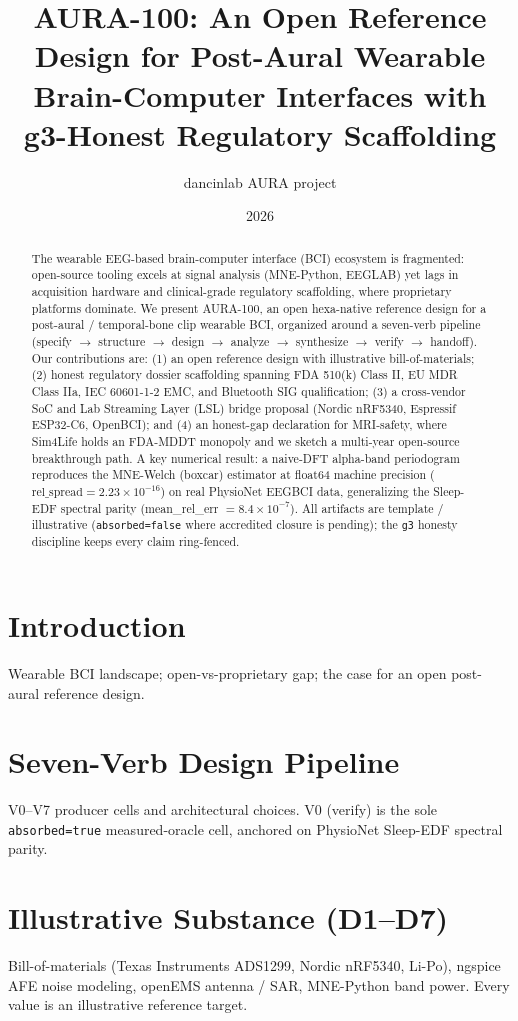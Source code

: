 \documentclass[11pt]{article}
\title{AURA-100: An Open Reference Design for Post-Aural Wearable\\
Brain-Computer Interfaces with g3-Honest Regulatory Scaffolding}
\author{dancinlab AURA project}
\date{2026}
\begin{document}
\maketitle

\begin{abstract}
The wearable EEG-based brain-computer interface (BCI) ecosystem is
fragmented: open-source tooling excels at signal analysis (MNE-Python,
EEGLAB) yet lags in acquisition hardware and clinical-grade regulatory
scaffolding, where proprietary platforms dominate. We present AURA-100,
an open hexa-native reference design for a post-aural / temporal-bone
clip wearable BCI, organized around a seven-verb pipeline
(specify $\to$ structure $\to$ design $\to$ analyze $\to$ synthesize
$\to$ verify $\to$ handoff). Our contributions are: (1) an open
reference design with illustrative bill-of-materials; (2) honest
regulatory dossier scaffolding spanning FDA 510(k) Class II, EU MDR
Class IIa, IEC 60601-1-2 EMC, and Bluetooth SIG qualification; (3) a
cross-vendor SoC and Lab Streaming Layer (LSL) bridge proposal
(Nordic nRF5340, Espressif ESP32-C6, OpenBCI); and (4) an honest-gap
declaration for MRI-safety, where Sim4Life holds an FDA-MDDT monopoly
and we sketch a multi-year open-source breakthrough path. A key
numerical result: a naive-DFT alpha-band periodogram reproduces the
MNE-Welch (boxcar) estimator at float64 machine precision
($\text{rel\_spread} = 2.23 \times 10^{-16}$) on real PhysioNet
EEGBCI data, generalizing the Sleep-EDF spectral parity
(mean\_rel\_err $= 8.4 \times 10^{-7}$). All artifacts are
template / illustrative (\texttt{absorbed=false} where accredited
closure is pending); the \texttt{g3} honesty discipline keeps every
claim ring-fenced.
\end{abstract}

\section{Introduction}
Wearable BCI landscape; open-vs-proprietary gap; the case for an open
post-aural reference design.

\section{Seven-Verb Design Pipeline}
V0--V7 producer cells and architectural choices. V0 (verify) is the
sole \texttt{absorbed=true} measured-oracle cell, anchored on
PhysioNet Sleep-EDF spectral parity.

\section{Illustrative Substance (D1--D7)}
Bill-of-materials (Texas Instruments ADS1299, Nordic nRF5340, Li-Po),
ngspice AFE noise modeling, openEMS antenna / SAR, MNE-Python band
power. Every value is an illustrative reference target.
\end{document}
